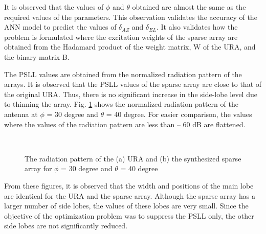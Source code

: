 It is observed that the values of $\phi$ and $\theta$ obtained are almost the same as the required values of the parameters. This observation validates the accuracy of the ANN model to predict the values of $\delta_{AZ}$ and $\delta_{EL}$. It also validates how the problem is formulated where the excitation weights of the sparse array are obtained from the Hadamard product of the weight matrix, W of the URA, and the binary matrix B.

The PSLL values are obtained from the normalized radiation pattern of the arrays. It is observed that the PSLL values of the sparse array are close to that of the original URA. Thus, there is no significant increase in the side-lobe level due to thinning the array. Fig. \ref{fig_5_8} shows the normalized radiation pattern of the antenna at $\phi$ = 30 degree and $\theta$ = 40 degree. For easier comparison, the values where the values of the radiation pattern are less than -- 60 dB are flattened.

\begin{figure}
  \centering
   ~~~~
  \\
  \caption{The radiation pattern of the (a) URA and (b) the synthesized sparse array for $\phi$ = 30 degree and $\theta$ = 40 degree} \label{fig_5_8}
\end{figure}

From these figures, it is observed that the width and positions of the main lobe are identical for the URA and the sparse array. Although the sparse array has a larger number of side lobes, the values of these lobes are very small. Since the objective of the optimization problem was to suppress the PSLL only, the other side lobes are not significantly reduced.


